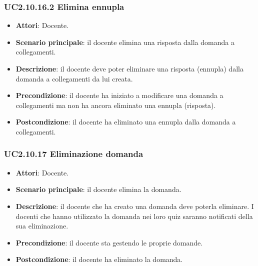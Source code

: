 \subsubsection{UC2.10.16.2 Elimina ennupla}
\begin{itemize}
\item \textbf{Attori}: Docente.
\item \textbf{Scenario principale}: il docente elimina una risposta dalla domanda a collegamenti.
\item \textbf{Descrizione}: il docente deve poter eliminare una risposta (ennupla) dalla domanda a collegamenti da lui creata.
\item \textbf{Precondizione}: il docente ha iniziato a modificare una domanda a collegamenti ma non ha ancora eliminato una ennupla (risposta).
\item \textbf{Postcondizione}: il docente ha eliminato una ennupla dalla domanda a collegamenti.
\end{itemize}
\subsubsection{UC2.10.17 Eliminazione domanda}
\begin{itemize}
\item \textbf{Attori}: Docente.
\item \textbf{Scenario principale}: il docente elimina la domanda.
\item \textbf{Descrizione}: il docente che ha creato una domanda deve poterla eliminare. I docenti che hanno utilizzato la domanda nei loro quiz saranno notificati della sua eliminazione.
\item \textbf{Precondizione}: il docente sta gestendo le proprie domande.
\item \textbf{Postcondizione}: il docente ha eliminato la domanda.
\end{itemize}
